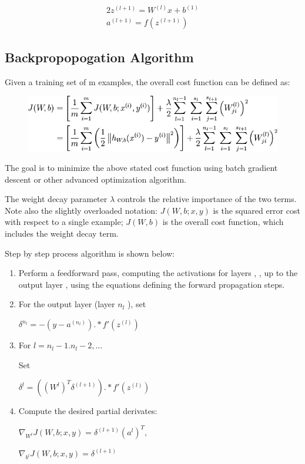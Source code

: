 \documentclass[a4paper, 12pt]{article}
\begin{document}
\begin{alignat}{2}
z^{(l+1)}= W^{(l)} x+ b^{(1)} \\
a^{(l+1)}= f(z^{(l+1)})
\end{alignat} 


\subsection{Backpropopogation Algorithm}
%
Given a training set of m examples, the overall cost function can be defined as:

\begin{figure}[H]
\includegraphics[scale= 0.5]{eq}
\end{figure}

The goal is to minimize the above stated cost function using batch gradient descent or other advanced optimization algorithm.

The weight decay parameter $\lambda$ controls the relative importance of the two terms. Note also the slightly overloaded notation: $J(W,b;x,y)$ is the squared error cost with respect to a single example; $J(W,b)$ is the overall cost function, which includes the weight decay term.


Step by step process algorithm is shown below:

\begin{enumerate}
\item Perform a feedforward pass, computing the activations for layers , , up to the output layer , using the equations defining the forward propagation steps.

\item For the output layer (layer $n_l$ ), set

   $ \delta^{n_l}= - (y - a^{(n_l)}).*f'(z^{(l)})$
\item For $l =n_l -1. n_l -2, ...$

Set

$\delta^l = ((W^{l})^T\delta^{(l+1)}).*f'(z^{(l)})$

\item Compute the desired partial derivates:
	
$\nabla_{W^l}J(W,b;x,y) =\delta^{(l+1)}(a^l)^T,$

$\nabla_{b^l}J(W,b;x,y) =\delta^{(l+1)}$
	
\end{enumerate}
\end{document}
